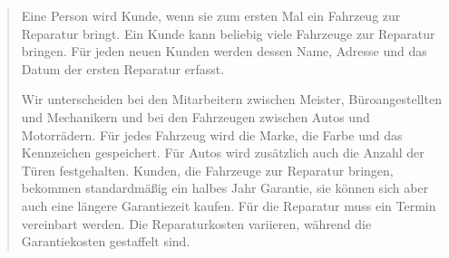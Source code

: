 \begin{quotation}
\noindent Eine Person wird Kunde, wenn sie zum ersten Mal ein Fahrzeug zur
Reparatur bringt. Ein Kunde kann beliebig viele Fahrzeuge zur Reparatur
bringen. Für jeden neuen Kunden werden dessen Name, Adresse und das Datum der
ersten Reparatur erfasst.

Wir unterscheiden bei den Mitarbeitern zwischen Meister, Büroangestellten und
Mechanikern und bei den Fahrzeugen zwischen Autos und Motorrädern. Für jedes
Fahrzeug wird die Marke, die Farbe und das Kennzeichen gespeichert. Für Autos
wird zusätzlich auch die Anzahl der Türen festgehalten. Kunden, die Fahrzeuge
zur Reparatur bringen, bekommen standardmäßig ein halbes Jahr Garantie, sie
können sich aber auch eine längere Garantiezeit kaufen. Für die Reparatur muss
ein Termin vereinbart werden. Die Reparaturkosten variieren, während die
Garantiekosten gestaffelt sind.
\end{quotation}
